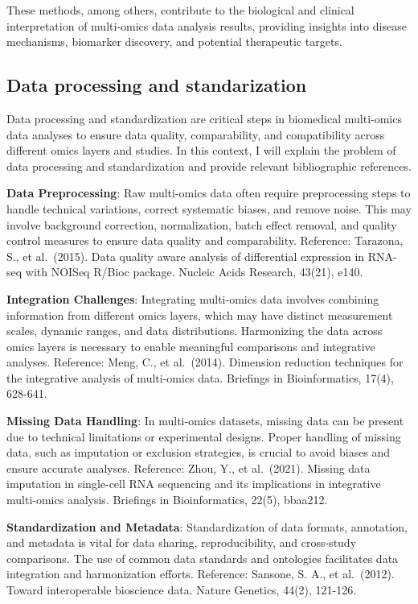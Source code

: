 \documentclass[a4paper, nobind]{templates/ociamthesis}
\begin{document}
These methods, among others, contribute to the biological and clinical interpretation of multi-omics data analysis results, providing insights into disease mechanisms, biomarker discovery, and potential therapeutic targets.

\hypertarget{data-processing-and-standarization}{%
\subsection{Data processing and standarization}\label{data-processing-and-standarization}}

Data processing and standardization are critical steps in biomedical multi-omics data analyses to ensure data quality, comparability, and compatibility across different omics layers and studies. In this context, I will explain the problem of data processing and standardization and provide relevant bibliographic references.

\textbf{Data Preprocessing}: Raw multi-omics data often require preprocessing steps to handle technical variations, correct systematic biases, and remove noise. This may involve background correction, normalization, batch effect removal, and quality control measures to ensure data quality and comparability. Reference: Tarazona, S., et al.~(2015). Data quality aware analysis of differential expression in RNA-seq with NOISeq R/Bioc package. Nucleic Acids Research, 43(21), e140.

\textbf{Integration Challenges}: Integrating multi-omics data involves combining information from different omics layers, which may have distinct measurement scales, dynamic ranges, and data distributions. Harmonizing the data across omics layers is necessary to enable meaningful comparisons and integrative analyses. Reference: Meng, C., et al.~(2014). Dimension reduction techniques for the integrative analysis of multi-omics data. Briefings in Bioinformatics, 17(4), 628-641.

\textbf{Missing Data Handling}: In multi-omics datasets, missing data can be present due to technical limitations or experimental designs. Proper handling of missing data, such as imputation or exclusion strategies, is crucial to avoid biases and ensure accurate analyses. Reference: Zhou, Y., et al.~(2021). Missing data imputation in single-cell RNA sequencing and its implications in integrative multi-omics analysis. Briefings in Bioinformatics, 22(5), bbaa212.

\textbf{Standardization and Metadata}: Standardization of data formats, annotation, and metadata is vital for data sharing, reproducibility, and cross-study comparisons. The use of common data standards and ontologies facilitates data integration and harmonization efforts. Reference: Sansone, S. A., et al.~(2012). Toward interoperable bioscience data. Nature Genetics, 44(2), 121-126.
\end{document}
